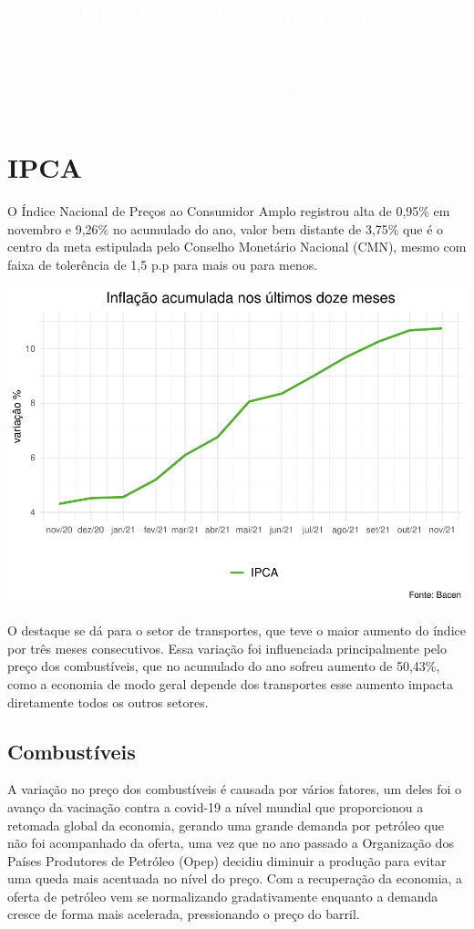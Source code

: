 \documentclass[100,a4paperpaper,]{article}
\title{\textbf{\textcolor{white}{Relatório de Conjuntura}}}
\author{\textbf{\textcolor{white}{Inflação}}}
\date{\textbf{\textcolor{white}{Novembro/2021}}}
\begin{document}
\renewcommand{\contentsname}{Sumário}


\maketitle
\tableofcontents
\clearpage

\section{IPCA} 
 \vspace{0,5cm}

O Índice Nacional de Preços ao Consumidor Amplo registrou alta de 0,95\%
em novembro e 9,26\% no acumulado do ano, valor bem distante de 3,75\%
que é o centro da meta estipulada pelo Conselho Monetário Nacional
(CMN), mesmo com faixa de tolerência de 1,5 p.p para mais ou para menos.

\includegraphics{inflacao_files/figure-latex/inflacao 12 meses-1.pdf}

O destaque se dá para o setor de transportes, que teve o maior aumento
do índice por três meses consecutivos. Essa variação foi influenciada
principalmente pelo preço dos combustíveis, que no acumulado do ano
sofreu aumento de 50,43\%, como a economia de modo geral depende dos
transportes esse aumento impacta diretamente todos os outros setores.
\newpage

\subsection{Combustíveis} 
 \vspace{0,5cm}

A variação no preço dos combustíveis é causada por vários fatores, um
deles foi o avanço da vacinação contra a covid-19 a nível mundial que
proporcionou a retomada global da economia, gerando uma grande demanda
por petróleo que não foi acompanhado da oferta, uma vez que no ano
passado a Organização dos Países Produtores de Petróleo (Opep) decidiu
diminuir a produção para evitar uma queda mais acentuada no nível do
preço. Com a recuperação da economia, a oferta de petróleo vem se
normalizando gradativamente enquanto a demanda cresce de forma mais
acelerada, pressionando o preço do barril.
\end{document}
